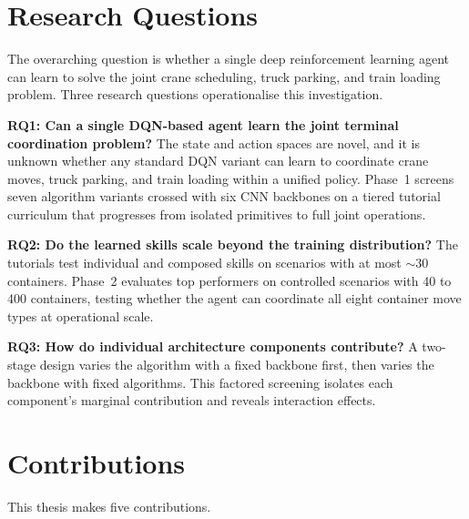 \section{Research Questions}
\label{sec:intro:rqs}

The overarching question is whether a single deep reinforcement learning agent can learn to solve the joint crane scheduling, truck parking, and train loading problem. Three research questions operationalise this investigation.

\textbf{RQ1: Can a single DQN-based agent learn the joint terminal coordination problem?} The state and action spaces are novel, and it is unknown whether any standard DQN variant can learn to coordinate crane moves, truck parking, and train loading within a unified policy. Phase~1 screens seven algorithm variants crossed with six CNN backbones on a tiered tutorial curriculum that progresses from isolated primitives to full joint operations.

\textbf{RQ2: Do the learned skills scale beyond the training distribution?} The tutorials test individual and composed skills on scenarios with at most ${\sim}30$ containers. Phase~2 evaluates top performers on controlled scenarios with 40 to 400 containers, testing whether the agent can coordinate all eight container move types at operational scale.

\textbf{RQ3: How do individual architecture components contribute?} A two-stage design varies the algorithm with a fixed backbone first, then varies the backbone with fixed algorithms. This factored screening isolates each component's marginal contribution and reveals interaction effects.

\section{Contributions}
\label{sec:intro:contributions}

This thesis makes five contributions.

